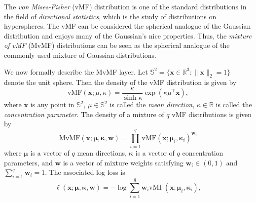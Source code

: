 \documentclass[sigconf,anonymous,review]{acmart}
\newcommand{\defn}[1]{\textit{#1}}
\newcommand{\trans}[1]{{#1}^{\top}}
\newcommand{\ltwo}[1]{\lVert {#1} \rVert_2}
\newcommand{\w}{\mathbf{w}}
\newcommand{\x}{\mathbf{x}}
\begin{document}
\begin{description}
        The \defn{von Mises-Fisher} (vMF) distribution is one of the standard distributions in the field of \defn{directional statistics},
        which is the study of distributions on hyperspheres.
        The vMF can be considered the spherical analogue of the Gaussian distribution \citep[e.g.][]{mardia2009directional} and enjoys many of the Gaussian's nice properties.
        Thus, the \defn{mixture of vMF} (MvMF) distributions can be seen as the spherical analogue of the commonly used mixture of Gaussian distributions.

        We now formally describe the MvMF layer.
        Let $\mathbb{S}^2 = \{ \x \in \mathbb R^3 : \ltwo{\x}=1 \}$ denote the unit sphere.
        Then the density of the vMF distribution is given by
        \begin{equation}
            \text{vMF}(\x;\mu,\kappa) = \frac{\kappa}{\sinh \kappa} \exp(\kappa\trans\mu\x),
        \end{equation}
        where 
        $\x$ is any point in $\mathbb{S}^2$,
        $\mu\in\mathbb{S}^2$ is called the \defn{mean direction},
        $\kappa\in\mathbb R$ is called the \defn{concentration parameter}.
        The density of a mixture of $q$ vMF distributions is given by
        \begin{equation}
            \text{MvMF}(\x;\boldsymbol{\mu},\boldsymbol{\kappa},\w) = \prod_{i=1}^q \text{vMF}(\x;\boldsymbol\mu_i,\boldsymbol\kappa_i)^{\w_i}
        \end{equation}
        where 
        $\boldsymbol\mu$ is a vector of $q$ mean directions,
        $\boldsymbol\kappa$ is a vector of $q$ concentration parameters,
        and $\w$ is a vector of mixture weights satisfying
        $\w_i\in(0,1)$ and $\sum_{i=1}^q \w_i = 1$.
        The associated log loss is 
        \begin{equation}
            \ell(\x;\boldsymbol\mu,\boldsymbol\kappa,\w) = -\log\sum_{i=1}^q {\w}_i \text{vMF}(\x;\boldsymbol\mu_i,\boldsymbol\kappa_i),

\end{equation}
\end{description}
\end{document}
